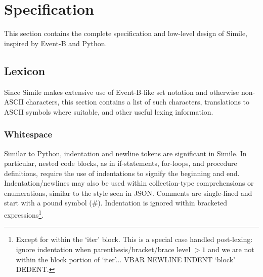 \documentclass{article}
\newcommand{\bSet}[3]{%
  \{\, #1 \cdot #2 \mid #3 \, \}%
}
\newcommand{\bSetT}[2]{%
  \{\, #1 \cdot #2 \,\}%
}
\begin{document}

\section{Specification}
This section contains the complete specification and low-level design of Simile, inspired by Event-B and Python.

\subsection{Lexicon}
Since Simile makes extensive use of Event-B-like set notation and otherwise non-ASCII characters, this section contains a list of such characters, translations to ASCII symbols where suitable, and other useful lexing information.

\subsubsection{Whitespace}
Similar to Python, indentation and newline tokens are significant in Simile. In particular, nested code blocks, as in if-statements, for-loops, and procedure definitions, require the use of indentations to signify the beginning and end. Indentation/newlines may also be used within collection-type comprehensions or enumerations, similar to the style seen in JSON. Comments are single-lined and start with a pound symbol (\#). Indentation is ignored within bracketed expressions\footnote{Except for within the `iter' block. This is a special case handled post-lexing: ignore indentation when parenthesis/bracket/brace level $>1$ and we are not within the block portion of `iter'... VBAR NEWLINE INDENT `block' DEDENT.}.
\end{document}
